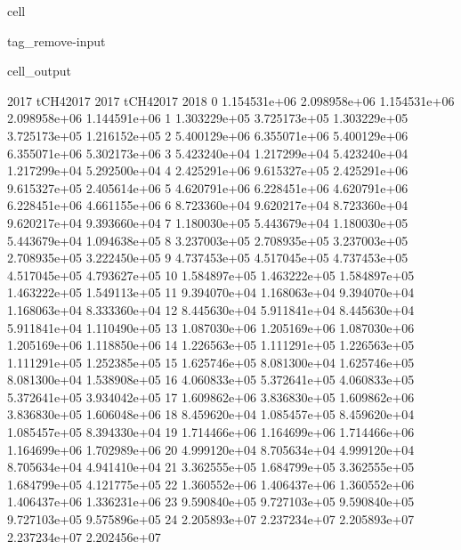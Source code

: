 \documentclass[letterpaper,10pt,english]{jupyterBook}
\begin{document}
\begin{sphinxuseclass}{cell}
\begin{sphinxuseclass}{tag_remove-input}
\begin{sphinxVerbatimOutput}
\begin{sphinxuseclass}{cell_output}
\begin{sphinxVerbatim}[commandchars=\\\{\}]
            2017     tCH4\PYGZus{}2017          2017     tCH4\PYGZus{}2017          2018  \PYGZbs{}
0   1.154531e+06  2.098958e+06  1.154531e+06  2.098958e+06  1.144591e+06   
1   1.303229e+05  3.725173e+05  1.303229e+05  3.725173e+05  1.216152e+05   
2   5.400129e+06  6.355071e+06  5.400129e+06  6.355071e+06  5.302173e+06   
3   5.423240e+04  1.217299e+04  5.423240e+04  1.217299e+04  5.292500e+04   
4   2.425291e+06  9.615327e+05  2.425291e+06  9.615327e+05  2.405614e+06   
5   4.620791e+06  6.228451e+06  4.620791e+06  6.228451e+06  4.661155e+06   
6   8.723360e+04  9.620217e+04  8.723360e+04  9.620217e+04  9.393660e+04   
7   1.180030e+05  5.443679e+04  1.180030e+05  5.443679e+04  1.094638e+05   
8   3.237003e+05  2.708935e+05  3.237003e+05  2.708935e+05  3.222450e+05   
9   4.737453e+05  4.517045e+05  4.737453e+05  4.517045e+05  4.793627e+05   
10  1.584897e+05  1.463222e+05  1.584897e+05  1.463222e+05  1.549113e+05   
11  9.394070e+04  1.168063e+04  9.394070e+04  1.168063e+04  8.333360e+04   
12  8.445630e+04  5.911841e+04  8.445630e+04  5.911841e+04  1.110490e+05   
13  1.087030e+06  1.205169e+06  1.087030e+06  1.205169e+06  1.118850e+06   
14  1.226563e+05  1.111291e+05  1.226563e+05  1.111291e+05  1.252385e+05   
15  1.625746e+05  8.081300e+04  1.625746e+05  8.081300e+04  1.538908e+05   
16  4.060833e+05  5.372641e+05  4.060833e+05  5.372641e+05  3.934042e+05   
17  1.609862e+06  3.836830e+05  1.609862e+06  3.836830e+05  1.606048e+06   
18  8.459620e+04  1.085457e+05  8.459620e+04  1.085457e+05  8.394330e+04   
19  1.714466e+06  1.164699e+06  1.714466e+06  1.164699e+06  1.702989e+06   
20  4.999120e+04  8.705634e+04  4.999120e+04  8.705634e+04  4.941410e+04   
21  3.362555e+05  1.684799e+05  3.362555e+05  1.684799e+05  4.121775e+05   
22  1.360552e+06  1.406437e+06  1.360552e+06  1.406437e+06  1.336231e+06   
23  9.590840e+05  9.727103e+05  9.590840e+05  9.727103e+05  9.575896e+05   
24  2.205893e+07  2.237234e+07  2.205893e+07  2.237234e+07  2.202456e+07   


\end{sphinxVerbatim}
\end{sphinxuseclass}
\end{sphinxVerbatimOutput}
\end{sphinxuseclass}
\end{sphinxuseclass}
\end{document}
